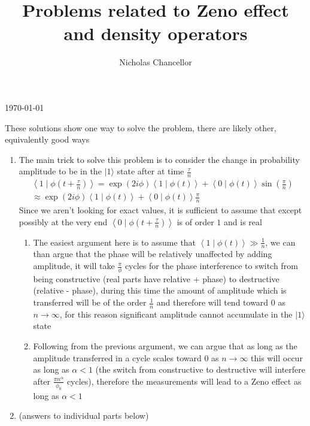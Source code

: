 \documentclass[english]{article}
\newcommand{\ket}[1]{|#1 \rangle}
\newcommand{\braket}[2]{\left \langle #1 \mid #2 \right \rangle}
\begin{document}
\title{Problems related to Zeno effect and density operators}
\author{Nicholas Chancellor}


\maketitle


\today %

{\small These solutions show one way to solve the problem, there are likely other, equivalently good ways}

\begin{enumerate}
\item The main trick to solve this problem is to consider the change in probability amplitude to be in the $\ket{1}$ state after at time $\frac{\tau}{n}$
\begin{align}
\braket{1}{\phi(t+\frac{\tau}{n})}=\exp(2i  \phi) \braket{1}{\phi(t)}+\braket{0}{\phi(t)}\sin(\frac{\pi}{n})\\
\approx \exp(2i  \phi) \braket{1}{\phi(t)}+\braket{0}{\phi(t)}\frac{\pi}{n}
\end{align}
Since we aren't looking for exact values, it is sufficient to assume that except possibly at the very end $\braket{0}{\phi(t+\frac{\tau}{n})}$ is of order $1$ and is real
\begin{enumerate}
\item The easiest argument here is to assume that $\braket{1}{\phi(t)}\gg \frac{1}{n}$, we can than argue that the phase will be relatively unaffected by adding amplitude, it will take $\frac{\pi}{\phi}$ cycles for the phase interference to switch from being constructive (real parts have relative + phase) to destructive (relative - phase), during this time the amount of amplitude which is transferred will be of the order $\frac{1}{n}$ and therefore will tend toward $0$ as $n\rightarrow \infty$, for this reason significant amplitude cannot accumulate in the $\ket{1}$ state
\item Following from the previous argument, we can argue that as long as the amplitude transferred in a cycle scales toward $0$ as $n\rightarrow \infty$ this will occur as long as $\alpha<1$ (the switch from constructive to destructive will interfere after $\frac{\pi n^\alpha}{\phi_0}$ cycles), therefore the measurements will lead to a Zeno effect as long as  $\alpha<1$
\end{enumerate}
\item (answers to individual parts below)
\begin{enumerate}

\end{enumerate}
\end{enumerate}
\end{document}
